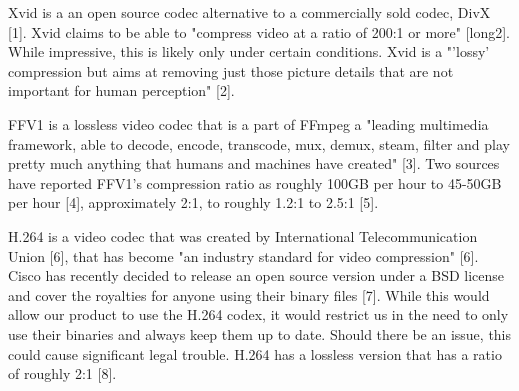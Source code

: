 \documentclass[onecolumn, draftclsnofoot,10pt, compsoc]{IEEEtran}
\begin{document}
Xvid is a an open source codec alternative to a commercially sold codec, DivX [1].
Xvid claims to be able to "compress video at a ratio of 200:1 or more" [long2]. 
While impressive, this is likely only under certain conditions.
Xvid is a "'lossy' compression but aims at removing just those picture details that are not important for human perception" [2].

FFV1 is a lossless video codec that is a part of FFmpeg a "leading multimedia framework, able to decode, encode, transcode, mux, demux, steam, filter and play pretty much anything that humans and machines have created" [3].
Two sources have reported FFV1's compression ratio as roughly 100GB per hour to 45-50GB per hour [4],
approximately 2:1, to roughly 1.2:1 to 2.5:1 [5].

H.264 is a video codec that was created by International Telecommunication Union [6],
that has become "an industry standard for video compression" [6]. %
Cisco has recently decided to release an open source version under a BSD license and cover the royalties for anyone using their binary files [7].
While this would allow our product to use the H.264 codex, it would restrict us in the need to only use their binaries and always keep them up to date.
Should there be an issue, this could cause significant legal trouble.
H.264 has a lossless version that has a ratio of roughly 2:1 [8].
\end{document}
